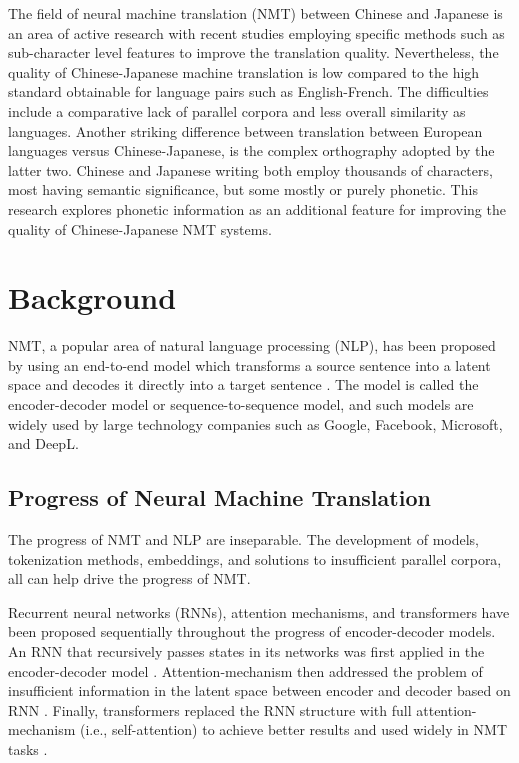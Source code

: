\hspace{24pt}

The field of neural machine translation (NMT) between Chinese and Japanese is an area of active research with recent studies employing specific methods such as sub-character level features to improve the translation quality. Nevertheless, the quality of Chinese-Japanese machine translation is low compared to the high standard obtainable for language pairs such as English-French. The difficulties include a comparative lack of parallel corpora and less overall similarity as languages. Another striking difference between translation between European languages versus Chinese-Japanese, is the complex orthography adopted by the latter two. Chinese and Japanese writing both employ thousands of characters, most having semantic significance, but some mostly or purely phonetic.
This research explores phonetic information as an additional feature for improving the quality of Chinese-Japanese NMT systems.

\section{Background} \label{sec:background}

NMT, a popular area of natural language processing (NLP), has been proposed by using an end-to-end model which transforms a source sentence into a latent space and decodes it directly into a target sentence \cite{sutskever2014sequence, cho2014learning}. The model is called the encoder-decoder model or sequence-to-sequence model, and such models are widely used by large technology companies such as Google, Facebook, Microsoft, and DeepL.

\subsection{Progress of Neural Machine Translation} \label{sec:nmt}

The progress of NMT and NLP are inseparable. The development of models, tokenization methods, embeddings, and solutions to insufficient parallel corpora, all can help drive the progress of NMT.

Recurrent neural networks (RNNs), attention mechanisms, and transformers have been proposed sequentially throughout the progress of encoder-decoder models. An RNN that recursively passes states in its networks was first applied in the encoder-decoder model \cite{cho2014learning}. Attention-mechanism then addressed the problem of insufficient information in the latent space between encoder and decoder based on RNN \cite{bahdanau2014neural}. Finally, transformers replaced the RNN structure with full attention-mechanism (i.e., self-attention) to achieve better results and used widely in NMT tasks \cite{NIPS2017_3f5ee243}. 

